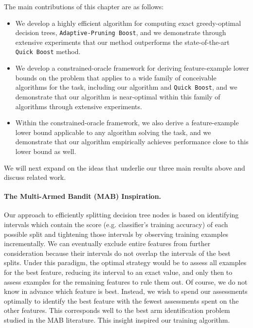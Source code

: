 The main contributions of this chapter are as follows:\vspace{-0.5\baselineskip}
\begin{itemize}
\item We develop a highly efficient algorithm for computing exact
  greedy-optimal decision trees, \texttt{Adaptive-Pruning Boost}, and
  we demonstrate through extensive experiments that our method
  outperforms the state-of-the-art \texttt{Quick Boost} method.
\item We develop a constrained-oracle framework for deriving
  feature-example lower bounds on the problem that applies to a wide
  family of conceivable algorithms for the task, including our
  algorithm and \texttt{Quick Boost}, and we demonstrate that our
  algorithm is near-optimal within this family of algorithms through
  extensive experiments.
\item Within the constrained-oracle framework, we also derive a
  feature-example lower bound applicable to any algorithm solving the
  task, and we demonstrate that our algorithm empirically achieves
  performance close to this lower bound as well.
\end{itemize}

We will next expand on the ideas that underlie
our three main results above and discuss related work.

\paragraph{The Multi-Armed Bandit (MAB) Inspiration.}
Our approach to efficiently splitting decision tree nodes is based on
identifying intervals which contain the score (e.g. classifier's training accuracy) of each possible split and tightening those
intervals by observing training examples incrementally.
We can eventually exclude entire features
from further consideration because their intervals do not
overlap the intervals of the best splits.
Under this paradigm, the optimal strategy would be to assess all
examples for the best feature,
reducing its interval to an exact value,
and only then to assess examples for the remaining features
to rule them out.
Of course, we do not know in advance which feature is best.
Instead, we wish to spend our assessments optimally to identify the
best feature with the fewest assessments spent on the other features.
This corresponds well to the best arm identification problem studied
in the MAB literature. This insight inspired our training algorithm.

